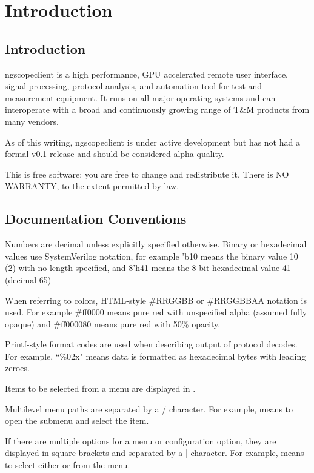 \chapter{Introduction}

\section{Introduction}

ngscopeclient is a high performance, GPU accelerated remote user interface, signal processing, protocol analysis, and
automation tool for test and measurement equipment. It runs on all major operating systems and can interoperate with a
broad and continuously growing range of T\&M products from many vendors.

As of this writing, ngscopeclient is under active development but has not had a formal v0.1
release and should be considered alpha quality.

This is free software: you are free to change and redistribute it.
There is NO WARRANTY, to the extent permitted by law.

\section{Documentation Conventions}

Numbers are decimal unless explicitly specified otherwise. Binary or hexadecimal values use SystemVerilog notation, for
example 'b10 means the binary value 10 (2) with no length specified, and 8'h41 means the 8-bit hexadecimal value 41
(decimal 65)

When referring to colors, HTML-style \#RRGGBB or \#RRGGBBAA notation is used. For example \#ff0000 means pure red with
unspecified alpha (assumed fully opaque) and \#ff000080 means pure red with 50\% opacity.

Printf-style format codes are used when describing output of protocol decodes. For example, ``\%02x" means data is
formatted as hexadecimal bytes with leading zeroes.

Items to be selected from a menu are displayed in .

Multilevel menu paths are separated by a / character. For example,  means to open the
 submenu and select the  item.

If there are multiple options for a menu or configuration option, they are displayed in square brackets and separated
by a | character. For example,  means to select either
 or  from the 
menu.

